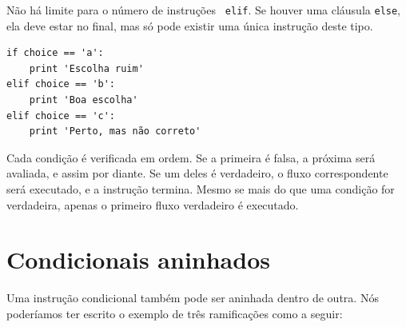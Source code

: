 Não há limite para o número de instruções {\tt
elif}. Se houver uma cláusula {\tt else}, ela deve estar no final,
mas só pode existir uma única instrução deste tipo.



\beforeverb
\begin{verbatim}
if choice == 'a':
    print 'Escolha ruim'
elif choice == 'b':
    print 'Boa escolha'
elif choice == 'c':
    print 'Perto, mas não correto'
\end{verbatim}
\afterverb
%

Cada condição é verificada em ordem. Se a primeira é falsa,
a próxima será avaliada, e assim por diante. Se um deles é
verdadeiro, o fluxo correspondente será executado, e a instrução
termina. Mesmo se mais do que uma condição for verdadeira, apenas o
primeiro fluxo verdadeiro é executado.



\section{Condicionais aninhados}


Uma instrução condicional também pode ser aninhada dentro de outra. 
Nós poderíamos ter escrito o exemplo de três ramificações como a seguir:


